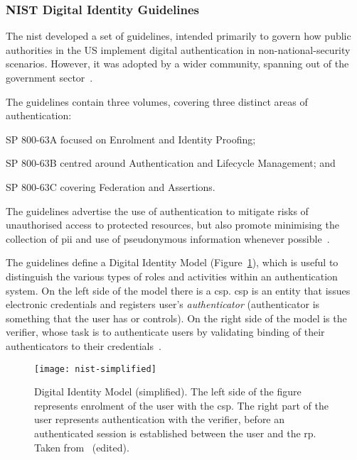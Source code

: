 \subsubsection{NIST Digital Identity Guidelines}

The \acrfull{nist} developed a set of guidelines, intended primarily to govern how public authorities in the US implement digital authentication in non-national-security scenarios. However, it was adopted by a wider community, spanning out of the government sector~\cite{Grassi2017GovernmentCollaboration}.

The guidelines contain three volumes, covering three distinct areas of authentication:
\begin{enumerate*}[label=(\roman*)]
    \item SP 800-63A focused on Enrolment and Identity Proofing;
    \item SP 800-63B centred around Authentication and Lifecycle Management; and
    \item SP 800-63C covering Federation and Assertions.
\end{enumerate*}
The guidelines advertise the use of authentication to mitigate risks of unauthorised access to protected resources, but also promote minimising the collection of \acrfull{pii} and use of pseudonymous information whenever possible~\cite{Grassi2017Digital3}.

The guidelines define a Digital Identity Model (Figure~\ref{fig:nist-model}), which is useful to distinguish the various types of roles and activities within an authentication system. On the left side of the model there is a \acrfull{csp}. \acrshort{csp} is an entity that issues electronic credentials and registers user's \textit{authenticator} (authenticator is something that the user has or controls). On the right side of the model is the verifier, whose task is to authenticate users by validating binding of their authenticators to their credentials~\cite{Grassi2017Digital3}.

 \begin{figure}[ht]
    \centering
    \texttt{[image: nist-simplified]}
    \caption{Digital Identity Model (simplified). The left side of the figure represents enrolment of the user with the \acrshort{csp}. The right part of the user represents authentication with the verifier, before an authenticated session is established between the user and the \acrshort{rp}. Taken from~\cite{Grassi2017Digital3} (edited).}
    \label{fig:nist-model}
\end{figure}

